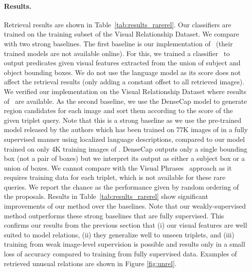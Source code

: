 \documentclass[10pt,twocolumn,letterpaper]{article}
\newcommand{\spaceparagraph}{\vspace{-.35cm}}
\begin{document}
\spaceparagraph
\paragraph{Results.}
Retrieval results are shown in Table~\ref{tab:results_rarerel}. Our classifiers are trained on the training subset of the Visual Relationship Dataset. 
We compare with two strong baselines. The first baseline is our implementation of~\cite{Lu16} (their trained models are not available online). For this, we trained a classifier~\cite{ren15} to output predicates given visual features extracted from the union of subject and object bounding boxes. We do not use the language model as its score does not affect the retrieval results (only adding a constant offset to all retrieved images). We verified our implementation on the Visual Relationship Dataset where results of~\cite{Lu16} are available. As the second baseline, we use the DenseCap \cite{Johnson2015} model to generate region candidates for each image and sort them according to the score of the given triplet query. Note that this is a strong baseline as we use the pre-trained model released by the authors which has been trained on 77K images of \cite{Krishna2016} in a fully supervised manner using localized language descriptions, compared to our model trained on only 4K training images of \cite{Lu16}. DenseCap outputs only a single bounding box (not a pair of boxes) but we interpret its output as either a subject box or a union of boxes. We cannot compare with the Visual Phrases~\cite{Sadeghi2011} approach as it requires training data for each triplet, which is not available for these rare queries. We report the chance as the performance given by random ordering of the proposals. Results in Table~\ref{tab:results_rarerel} show significant improvements of our method over the baselines. Note that our weakly-supervised method outperforms these strong baselines that are fully supervised. This confirms our results from the previous section that (i) our visual features are well suited to model relations, (ii) they generalize well to unseen triplets, and (iii)  training from weak image-level supervision is possible and results only in a small loss of accuracy compared to training from fully supervised data. Examples of retrieved unusual relations are shown in Figure \ref{fig:unrel}. 
\end{document}
